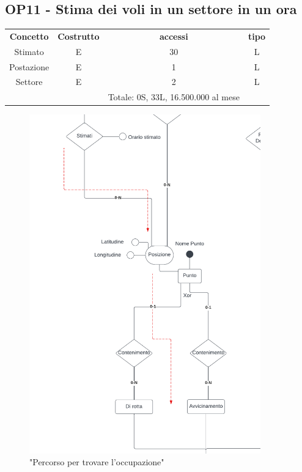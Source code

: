     \subsection*{OP11 - Stima dei voli in un settore in un ora}
    \begin{table}[H]
    \centering
    \begin{tabular}{cccc}
  
    \rowcolor{tableheadercolor}
    \textbf{Concetto} & \textbf{Costrutto} & \textbf{accessi} & \textbf{tipo}\\
  
    Stimato & E & 30 & L \\
    Postazione & E & 1 & L \\
    Settore & E & 2 & L \\
    & & Totale: 0S, 33L, 16.500.000 al mese &\\
  
    \end{tabular}
    \end{table}
    \begin{figure}[H]
      \centering
      \includegraphics[width=10cm]{figures/BasicControllerarrowsp1.pdf}
      \caption{"Percorso per trovare l'occupazione"}
    \end{figure}
    
